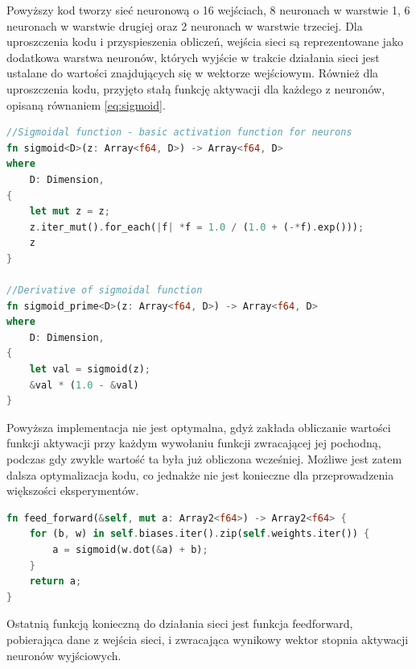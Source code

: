 \documentclass[12pt,twoside]{article}
\begin{document}
Powyższy kod tworzy sieć neuronową o 16 wejściach, 8 neuronach w warstwie 1, 6 neuronach w warstwie drugiej oraz 2 neuronach w warstwie trzeciej.
Dla uproszczenia kodu i przyspieszenia obliczeń, wejścia sieci są reprezentowane jako dodatkowa warstwa neuronów, których wyjście w trakcie działania sieci jest ustalane do wartości znajdujących się w wektorze wejściowym.
Również dla uproszczenia kodu, przyjęto stałą funkcję aktywacji dla każdego z neuronów, opisaną równaniem \ref{eq:sigmoid}.


\begin{lstlisting}[language=Rust,caption=Funkcja sigmoidalna oraz jej pochodna,label={lst:sigmoid}]
//Sigmoidal function - basic activation function for neurons
fn sigmoid<D>(z: Array<f64, D>) -> Array<f64, D>
where
    D: Dimension,
{
    let mut z = z;
    z.iter_mut().for_each(|f| *f = 1.0 / (1.0 + (-*f).exp()));
    z
}

//Derivative of sigmoidal function
fn sigmoid_prime<D>(z: Array<f64, D>) -> Array<f64, D>
where
    D: Dimension,
{
    let val = sigmoid(z);
    &val * (1.0 - &val)
}
\end{lstlisting}

Powyższa implementacja nie jest optymalna, gdyż zakłada obliczanie wartości funkcji aktywacji przy każdym wywołaniu funkcji zwracającej jej pochodną, podczas gdy zwykle wartość ta była już obliczona wcześniej.
Możliwe jest zatem dalsza optymalizacja kodu, co jednakże nie jest konieczne dla przeprowadzenia większości eksperymentów.


\begin{lstlisting}[language=Rust,caption=Realizacja funkcji feed-forward,label={lst:feedforward}]
fn feed_forward(&self, mut a: Array2<f64>) -> Array2<f64> {
	for (b, w) in self.biases.iter().zip(self.weights.iter()) {
		a = sigmoid(w.dot(&a) + b);
	}
	return a;
}
\end{lstlisting}

Ostatnią funkcją konieczną do działania sieci jest funkcja feedforward, pobierająca dane z wejścia sieci, i zwracająca wynikowy wektor stopnia aktywacji neuronów wyjściowych.
\end{document}
